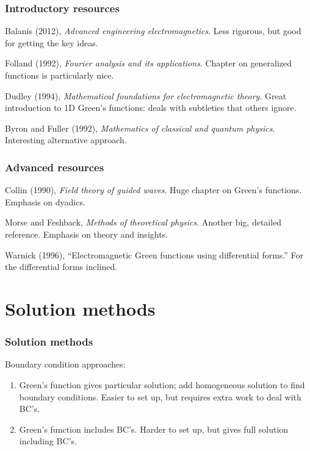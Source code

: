 \documentclass[12 pt, compress, handout, intlimits]{beamer}
\begin{document}
\begin{frame}[fragile]
    \frametitle{Introductory resources}
    Balanis (2012), \emph{Advanced engineering electromagnetics}. 
    Less rigorous, but good for getting the key ideas.

    Folland (1992), \emph{Fourier analysis and its applications}. 
    Chapter on generalized functions is particularly nice.

    Dudley (1994), \emph{Mathematical foundations for electromagnetic theory}.
    Great introduction to 1D Green's functions: deals with subtleties that others ignore.

    Byron and Fuller (1992), \emph{Mathematics of classical and quantum physics}.
    Interesting alternative approach.
    
\end{frame}

\note{}

\begin{frame}[fragile]
    \frametitle{Advanced resources}
    Collin (1990), \emph{Field theory of guided waves}. 
    Huge chapter on Green's functions. Emphasis on dyadics.

    Morse and Feshback, \emph{Methods of theoretical physics}.
    Another big, detailed reference. Emphasis on theory and insights.

    Warnick (1996), ``Electromagnetic Green functions using differential forms.''
    For the differential forms inclined.

\end{frame}    

\note{}

\section{Solution methods}
\label{sec:solution_methods}

\note{}

\begin{frame}[fragile]
    \frametitle{Solution methods}
    Boundary condition approaches:
    \begin{enumerate}
    \item
        Green's function gives particular solution; add homogeneous solution to find boundary conditions.
        Easier to set up, but requires extra work to deal with BC's.
    \item
        Green's function includes BC's.
        Harder to set up, but gives full solution including BC's.
    \end{enumerate}
\end{frame}
\end{document}
